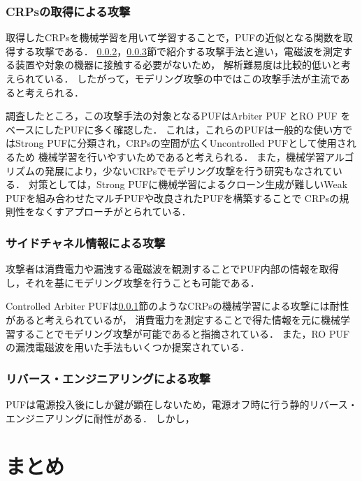\documentclass[technicalreport]{ieicej} %
\begin{document}
\subsubsection{CRPsの取得による攻撃}
\label{Crps}
取得したCRPsを機械学習を用いて学習することで，PUFの近似となる関数を取得する攻撃である．
\ref{sidechannel}，\ref{reattack}節で紹介する攻撃手法と違い，電磁波を測定する装置や対象の機器に接触する必要がないため，
解析難易度は比較的低いと考えられている\cite{nozaki}．
したがって，モデリング攻撃の中ではこの攻撃手法が主流であると考えられる．

調査したところ，この攻撃手法の対象となるPUFはArbiter PUF\cite{crps apuf1,crps apuf2,crps apuf3 multi1,crps apuf4 side,crps apuf5 multi2,crps apuf6,crps modeling,crps apuf7 crc}
とRO PUF\cite{nozaki,crps modeling,crps RO}
をベースにしたPUFに多く確認した．
これは，これらのPUFは一般的な使い方ではStrong PUFに分類され，CRPsの空間が広くUncontrolled PUFとして使用されるため
機械学習を行いやすいためであると考えられる．
また，機械学習アルゴリズムの発展により，少ないCRPsでモデリング攻撃を行う研究もなされている\cite{nozaki}．
対策としては，Strong PUFに機械学習によるクローン生成が難しいWeak PUFを組み合わせたマルチPUF\cite{crps apuf3 multi1,crps apuf5 multi2}や改良されたPUF\cite{crps apuf7 crc}を構築することで
CRPsの規則性をなくすアプローチがとられている．

\subsubsection{サイドチャネル情報による攻撃}
\label{sidechannel}
攻撃者は消費電力や漏洩する電磁波を観測することでPUF内部の情報を取得し，それを基にモデリング攻撃を行うことも可能である．

Controlled Arbiter PUFは\ref{Crps}節のようなCRPsの機械学習による攻撃には耐性があると考えられているが，
消費電力を測定することで得た情報を元に機械学習することでモデリング攻撃が可能であると指摘されている\cite{side apuf}．
また，RO PUFの漏洩電磁波を用いた手法\cite{side rpuf1,side rpuf2,side rpuf3}もいくつか提案されている．
\subsubsection{リバース・エンジニアリングによる攻撃}
\label{reattack}
PUFは電源投入後にしか鍵が顕在しないため，電源オフ時に行う静的リバース・エンジニアリングに耐性がある．
しかし，


\section{まとめ}
\end{document}
